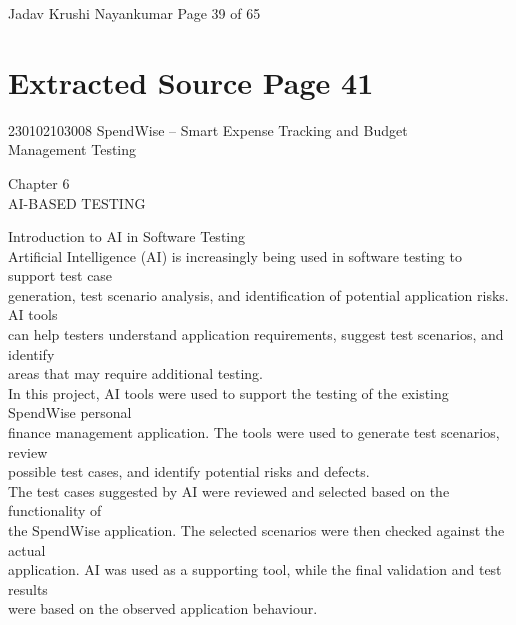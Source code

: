 \documentclass[12pt,a4paper]{report}
\begin{document}
\smallskip

\smallskip

\smallskip

\smallskip
Jadav Krushi Nayankumar                                                       Page 39 of 65\\ 

\clearpage
\section*{Extracted Source Page 41}
230102103008                          SpendWise – Smart Expense Tracking and Budget\\ 
Management Testing\\ 

\smallskip

\smallskip

\smallskip
Chapter 6\\ 

\smallskip
AI-BASED TESTING\\ 

\smallskip

 Introduction to AI in Software Testing\\ 

\smallskip
Artificial Intelligence (AI) is increasingly being used in software testing to support test case\\ 
generation, test scenario analysis, and identification of potential application risks. AI tools\\ 
can help testers understand application requirements, suggest test scenarios, and identify\\ 
areas that may require additional testing.\\ 
In this project, AI tools were used to support the testing of the existing SpendWise personal\\ 
finance management application. The tools were used to generate test scenarios, review\\ 
possible test cases, and identify potential risks and defects.\\ 
The test cases suggested by AI were reviewed and selected based on the functionality of\\ 
the SpendWise application. The selected scenarios were then checked against the actual\\ 
application. AI was used as a supporting tool, while the final validation and test results\\ 
were based on the observed application behaviour.\\ 
\end{document}
